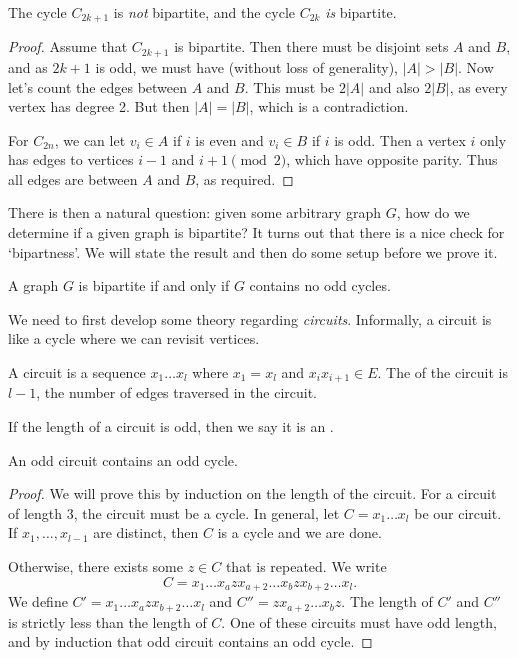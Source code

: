 \documentclass[a4paper]{scrartcl}
\begin{document}
\begin{proposition}
	The cycle $C_{2k + 1}$ is \emph{not} bipartite, and the cycle $C_{2k}$ \emph{is} bipartite.
\end{proposition}
\begin{proof}
	Assume that $C_{2k + 1}$ is bipartite. Then there must be disjoint sets $A$ and $B$, and as $2k + 1$ is odd, we must have (without loss of generality), $|A| > |B|$. Now let's count the edges between $A$ and $B$. This must be $2|A|$ and also $2|B|$, as every vertex has degree 2. But then $|A| = |B|$, which is a contradiction.

	For $C_{2n}$, we can let $v_i \in A$ if $i$ is even and $v_i \in B$ if $i$ is odd. Then a vertex $i$ only has edges to vertices $i - 1$ and $i + 1 \pmod{2}$, which have opposite parity. Thus all edges are between $A$ and $B$, as required.
\end{proof}

There is then a natural question: given some arbitrary graph $G$, how do we determine if a given graph is bipartite? It turns out that there is a nice check for `bipartness'. We will state the result and then do some setup before we prove it. 

\begin{proposition}
	A graph $G$ is bipartite if and only if $G$ contains no odd cycles.
\end{proposition}

We need to first develop some theory regarding \emph{circuits}.
Informally, a circuit is like a cycle where we can revisit vertices.


\begin{definition}[Circuit]
A circuit is a sequence $x_1 \dots x_l$ where $x_1 = x_l$ and $x_i x_{i + 1} \in E$. The  of the circuit is $l - 1$, the number of edges traversed in the circuit.
\end{definition}

\begin{definition}
	If the length of a circuit is odd, then we say it is an .
\end{definition}

\begin{proposition}
An odd circuit contains an odd cycle.	
\end{proposition}
\begin{proof}
	We will prove this by induction on the length of the circuit. For a circuit of length $3$, the circuit must be a cycle.
	In general, let $C = x_1 \dots x_l$ be our circuit. If $x_1, \dots, x_{l - 1}$ are distinct, then $C$ is a cycle and we are done. 
	
	Otherwise, there exists some $z \in C$ that is repeated. We write 
	$$C = x_1 \dots x_a z x_{a + 2} \dots x_{b} z x_{b + 2} \dots x_l.$$
	We define $C' = x_1 \dots x_a z x_{b + 2} \dots x_l$ and $C'' = z x_{a + 2} \dots x_b z$. The length of $C'$ and $C''$ is strictly less than the length of $C$. One of these circuits must have odd length, and by induction that odd circuit contains an odd cycle.
\end{proof}
\end{document}
